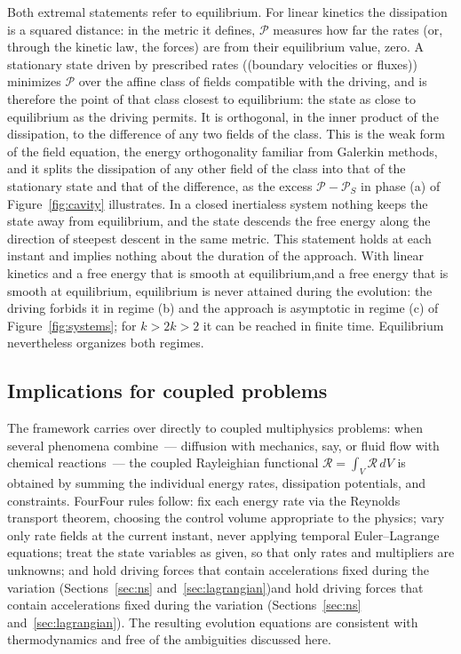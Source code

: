 \documentclass[12pt]{article}
\newif\ifhighlight \highlightfalse
\newif\ifhighlightfirst \highlightfirstfalse
\DeclareRobustCommand{\chg}[1]{\ifhighlight\ifhighlightfirst\textcolor{revised}{#1}\else#1\fi\else#1\fi}
\begin{document}
Both extremal statements refer to equilibrium. For linear kinetics the dissipation is a squared distance: in the metric it defines, $\mathcal{P}$ measures how far the rates (or, through the kinetic law, the forces) are from their equilibrium value, zero. A stationary state driven by prescribed rates \chg{(}boundary velocities or fluxes\chg{)} minimizes $\mathcal{P}$ over the affine class of fields compatible with the driving, and is therefore the point of that class closest to equilibrium: the state as close to equilibrium as the driving permits. It is orthogonal, in the inner product of the dissipation, to the difference of any two fields of the class. This is the weak form of the field equation, the energy orthogonality familiar from Galerkin methods, and it splits the dissipation of any other field of the class into that of the stationary state and that of the difference, as the excess $\mathcal{P} - \mathcal{P}_S$ in phase (a) of Figure~\ref{fig:cavity} illustrates. In a closed inertialess system nothing keeps the state away from equilibrium, and the state descends the free energy along the direction of steepest descent in the same metric. This statement holds at each instant and implies nothing about the duration of the approach. With linear kinetics \chg{and a free energy that is smooth at equilibrium,} equilibrium is never attained during the evolution: the driving forbids it in regime (b) and the approach is asymptotic in regime (c) of Figure~\ref{fig:systems}; for \chg{$k > 2$} it can be reached in finite time. Equilibrium nevertheless organizes both regimes.


\subsection{Implications for coupled problems}
\label{sec:coupled}

The framework carries over directly to coupled multiphysics problems: when several phenomena combine~--- diffusion with mechanics, say, or fluid flow with chemical reactions~--- the coupled Rayleighian functional $\mathcal{R} = \int_V \mathscr{R}\, dV$ is obtained by summing the individual energy rates, dissipation potentials, and constraints. \chg{Four} rules follow: fix each energy rate via the Reynolds transport theorem, choosing the control volume appropriate to the physics; vary only rate fields at the current instant, never applying temporal Euler--Lagrange equations; treat the state variables as given, so that only rates and multipliers are unknowns; \chg{and hold driving forces that contain accelerations fixed during the variation (Sections~\ref{sec:ns} and~\ref{sec:lagrangian})}. The resulting evolution equations are consistent with thermodynamics and free of the ambiguities discussed here.
\end{document}
